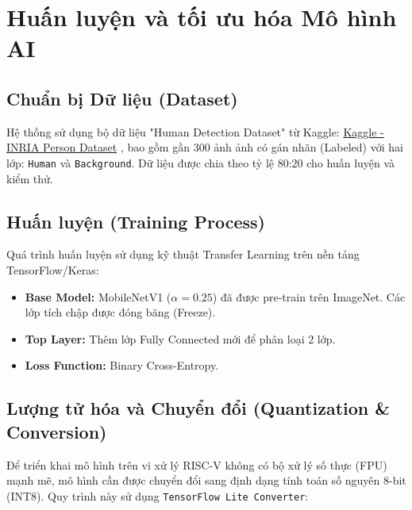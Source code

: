 %
\newpage
\section{Huấn luyện và tối ưu hóa Mô hình AI}

\subsection{Chuẩn bị Dữ liệu (Dataset)}
Hệ thống sử dụng bộ dữ liệu "Human Detection Dataset" từ Kaggle: 
\href{https://www.kaggle.com/datasets/jcoral02/inriaperson}{Kaggle - INRIA Person Dataset}
, bao gồm gần 300 ảnh 
ảnh có gán nhãn (Labeled) với hai lớp: \texttt{Human} và \texttt{Background}. 
Dữ liệu được chia theo tỷ lệ 80:20 cho huấn luyện và kiểm thử.

\subsection{Huấn luyện (Training Process)}
Quá trình huấn luyện sử dụng kỹ thuật Transfer Learning trên nền tảng TensorFlow/Keras:
\begin{itemize}
    \item \textbf{Base Model:} MobileNetV1 ($ \alpha=0.25 $) đã được pre-train trên 
    ImageNet. Các lớp tích chập được đóng băng (Freeze).
    \item \textbf{Top Layer:} Thêm lớp Fully Connected mới để phân loại 2 lớp.
    \item \textbf{Loss Function:} Binary Cross-Entropy.
\end{itemize}



\subsection{Lượng tử hóa và Chuyển đổi (Quantization \& Conversion)}
Để triển khai mô hình trên vi xử lý RISC-V không có bộ xử lý số thực (FPU) mạnh mẽ, mô hình cần được chuyển đổi sang định dạng tính toán số nguyên 8-bit (INT8). Quy trình này sử dụng \texttt{TensorFlow Lite Converter}:

